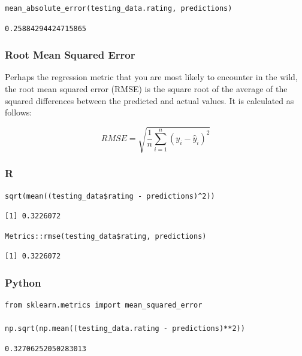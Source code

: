\documentclass[
  letterpaper,
]{krantz}
\begin{document}
\begin{verbatim}
mean_absolute_error(testing_data.rating, predictions)
\end{verbatim}

\begin{verbatim}
0.25884294424715865
\end{verbatim}

\subsubsection{Root Mean Squared Error}\label{sec-knowing-metrics-rmse}

Perhaps the regression metric that you are most likely to encounter in
the wild, the root mean squared error (RMSE) is the square root of the
average of the squared differences between the predicted and actual
values. It is calculated as follows:

\[RMSE = \sqrt{\frac{1}{n}\sum_{i=1}^{n}(y_i - \hat{y}_i)^2}\]

\subsubsection{R}

\begin{verbatim}
sqrt(mean((testing_data$rating - predictions)^2))
\end{verbatim}

\begin{verbatim}
[1] 0.3226072
\end{verbatim}

\begin{verbatim}
Metrics::rmse(testing_data$rating, predictions)
\end{verbatim}

\begin{verbatim}
[1] 0.3226072
\end{verbatim}

\subsubsection{Python}

\begin{verbatim}
from sklearn.metrics import mean_squared_error

np.sqrt(np.mean((testing_data.rating - predictions)**2))
\end{verbatim}

\begin{verbatim}
0.32706252050283013
\end{verbatim}
\end{document}

